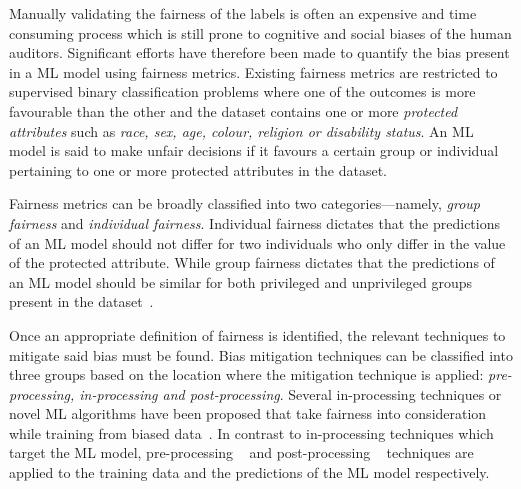 \documentclass[sigconf,review,anonymous]{acmart}
\begin{document}

Manually validating the fairness of the labels is often an expensive
and time consuming process which is still prone to cognitive and
social biases of the human auditors. Significant efforts have
therefore been made to quantify the bias present in a ML model using
fairness metrics. Existing fairness metrics are restricted to
supervised binary classification problems where one of the outcomes is
more favourable than the other and the dataset contains one or more
\emph{protected attributes} such as \emph{race, sex, age, colour,
religion or disability status}. An ML model is said to make unfair
decisions if it favours a certain group or individual pertaining to
one or more protected attributes in the dataset.

Fairness metrics can be broadly classified into two
categories---namely, \emph{group fairness} and \emph{individual
fairness}. Individual fairness dictates that the predictions of an ML
model should not differ for two individuals who only differ in the
value of the protected attribute. While group fairness dictates that
the predictions of an ML model should be similar for both privileged
and unprivileged groups present in the
dataset \cite{castelnovo2022clarification,hellman2020measuring,mitchell2021algorithmic,kusner2017counterfactual,grgic2016case,dwork2012fairness,barocas2019fairness,barocas2016big,hardt2016equality,binns2018fairness,verma2018fairness,saxena2019fairness}.

Once an appropriate definition of fairness is identified, the relevant
techniques to mitigate said bias must be found. Bias mitigation
techniques can be classified into three groups based on the location
where the mitigation technique is applied: \emph{pre-processing,
in-processing and post-processing}. Several in-processing techniques
or novel ML algorithms have been proposed that take fairness into
consideration while training from biased
data \cite{zhang2018mitigating,agarwal2018reductions,kearns2018preventing,kamishima2012fairness}. In
contrast to in-processing techniques which target the ML model,
pre-processing
 \cite{feldman2015certifying,zemel2013learning,calmon2017optimized,kamiran2012data}
and post-processing
 \cite{pleiss2017fairness,hardt2016equality,kamiran2012decision}
techniques are applied to the training data and the predictions of the
ML model respectively.
\end{document}
